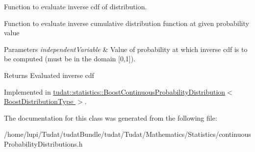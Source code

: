 Function to evaluate inverse cdf of distribution. 

Function to evaluate inverse cumulative distribution function at given probability value 
\begin{DoxyParams}{Parameters}
{\em independent\+Variable} & Value of probability at which inverse cdf is to be computed (must be in the domain \mbox{[}0,1\mbox{]}). \\
\hline
\end{DoxyParams}
\begin{DoxyReturn}{Returns}
Evaluated inverse cdf 
\end{DoxyReturn}


Implemented in \hyperlink{classtudat_1_1statistics_1_1BoostContinuousProbabilityDistribution_a37b9839a1ea5dd3c71a1f10b5ea65fbb}{tudat\+::statistics\+::\+Boost\+Continuous\+Probability\+Distribution$<$ Boost\+Distribution\+Type $>$}.



The documentation for this class was generated from the following file\+:\begin{DoxyCompactItemize}
\item 
/home/lupi/\+Tudat/tudat\+Bundle/tudat/\+Tudat/\+Mathematics/\+Statistics/continuous\+Probability\+Distributions.\+h\end{DoxyCompactItemize}
